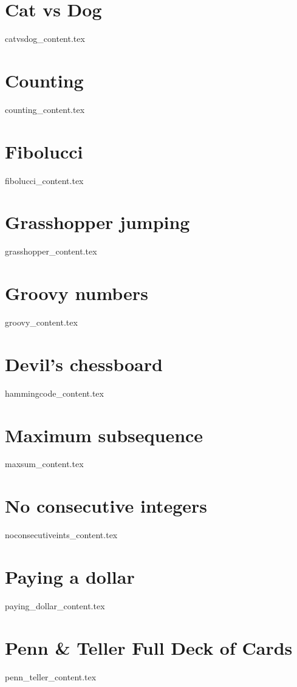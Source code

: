 \documentclass[justified, openany]{tufte-book}
\theoremstyle{plain}%
\theoremstyle{definition}
\theoremstyle{remark}
\begin{document}
\chapter{Cat vs Dog}
{catvsdog_content.tex}

\clearpage
\chapter{Counting}
{counting_content.tex}

\clearpage
\chapter{Fibolucci}
{fibolucci_content.tex}

\clearpage
\chapter{Grasshopper jumping}
{grasshopper_content.tex}

\clearpage
\chapter{Groovy numbers}
{groovy_content.tex}

\clearpage
\chapter{Devil's chessboard}
{hammingcode_content.tex}

\clearpage
\chapter{Maximum subsequence}
{maxsum_content.tex}

\clearpage
\chapter{No consecutive integers}
{noconsecutiveints_content.tex}

\clearpage
\chapter{Paying a dollar}
{paying_dollar_content.tex}

\clearpage
\chapter{Penn \& Teller Full Deck of Cards}
{penn_teller_content.tex}
\end{document}
